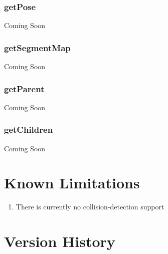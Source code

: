 \documentclass[12pt,a4paper,onecolumn]{article}
\begin{document}
\subsubsection*{getPose}
Coming Soon

\subsubsection*{getSegmentMap}
Coming Soon

\subsubsection*{getParent}
Coming Soon

\subsubsection*{getChildren}
Coming Soon


\newpage
\appendix
\section{Known Limitations}
\begin{enumerate}
\item There is currently no collision-detection support
\end{enumerate}

\section{Version History}
\end{document}
